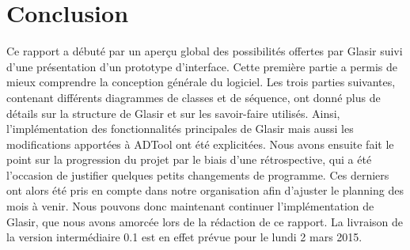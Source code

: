 \section{Conclusion}
    \label{sec:conclusion}

    Ce rapport a débuté par un aperçu global des possibilités offertes par Glasir suivi d'une présentation d'un prototype d'interface. Cette première partie a permis de mieux comprendre la conception générale du logiciel. Les trois parties suivantes, contenant différents diagrammes de classes et de séquence, ont donné plus de détails sur la structure de Glasir et sur les savoir-faire utilisés. Ainsi, l'implémentation des fonctionnalités principales de Glasir mais aussi les modifications apportées à ADTool ont été explicitées. Nous avons ensuite fait le point sur la progression du projet par le biais d'une rétrospective, qui a été l'occasion de justifier quelques petits changements de programme. Ces derniers ont alors été pris en compte dans notre organisation afin d'ajuster le planning des mois à venir. Nous pouvons donc maintenant continuer l'implémentation de Glasir, que nous avons amorcée lors de la rédaction de ce rapport. La livraison de la version intermédiaire 0.1 est en effet prévue pour le lundi 2 mars 2015.